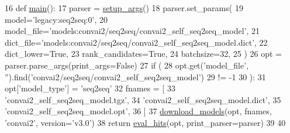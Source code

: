 \begin{DoxyCode}
16 \textcolor{keyword}{def }\hyperlink{namespaceseq2seq_1_1eval__hits_a6cc44d7d896f1429f58e24fb6e78a8c8}{main}():
17     parser = \hyperlink{namespaceprojects_1_1convai2_1_1eval__hits_a276af35abce11628a8e697b370218cf4}{setup\_args}()
18     parser.set\_params(
19         model=\textcolor{stringliteral}{'legacy:seq2seq:0'},
20         model\_file=\textcolor{stringliteral}{'models:convai2/seq2seq/convai2\_self\_seq2seq\_model'},
21         dict\_file=\textcolor{stringliteral}{'models:convai2/seq2seq/convai2\_self\_seq2seq\_model.dict'},
22         dict\_lower=\textcolor{keyword}{True},
23         rank\_candidates=\textcolor{keyword}{True},
24         batchsize=32,
25     )
26     opt = parser.parse\_args(print\_args=\textcolor{keyword}{False})
27     \textcolor{keywordflow}{if} (
28         opt.get(\textcolor{stringliteral}{'model\_file'}, \textcolor{stringliteral}{''}).find(\textcolor{stringliteral}{'convai2/seq2seq/convai2\_self\_seq2seq\_model'})
29         != -1
30     ):
31         opt[\textcolor{stringliteral}{'model\_type'}] = \textcolor{stringliteral}{'seq2seq'}
32         fnames = [
33             \textcolor{stringliteral}{'convai2\_self\_seq2seq\_model.tgz'},
34             \textcolor{stringliteral}{'convai2\_self\_seq2seq\_model.dict'},
35             \textcolor{stringliteral}{'convai2\_self\_seq2seq\_model.opt'},
36         ]
37         \hyperlink{namespaceparlai_1_1core_1_1build__data_ab697f23f05d3e36d7979fe5e0ed7911e}{download\_models}(opt, fnames, \textcolor{stringliteral}{'convai2'}, version=\textcolor{stringliteral}{'v3.0'})
38     \textcolor{keywordflow}{return} \hyperlink{namespaceprojects_1_1convai2_1_1eval__hits_a400fd6a2e183f2cf1da6ebeff169fe70}{eval\_hits}(opt, print\_parser=parser)
39 
40 
\end{DoxyCode}
